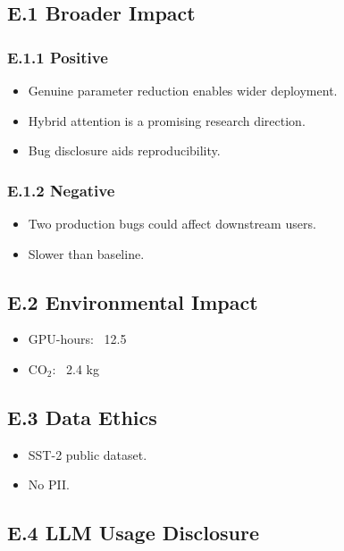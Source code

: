 \subsection{E.1 Broader Impact}

\subsubsection{E.1.1 Positive}

\begin{itemize}
\item Genuine parameter reduction enables wider deployment.
\item Hybrid attention is a promising research direction.
\item Bug disclosure aids reproducibility.

\end{itemize}
\subsubsection{E.1.2 Negative}

\begin{itemize}
\item Two production bugs could affect downstream users.
\item Slower than baseline.

\end{itemize}
\subsection{E.2 Environmental Impact}

\begin{itemize}
\item GPU-hours: ~12.5
\item CO$_2$: ~2.4 kg

\end{itemize}
\subsection{E.3 Data Ethics}

\begin{itemize}
\item SST-2 public dataset.
\item No PII.

\end{itemize}
\subsection{E.4 LLM Usage Disclosure}

